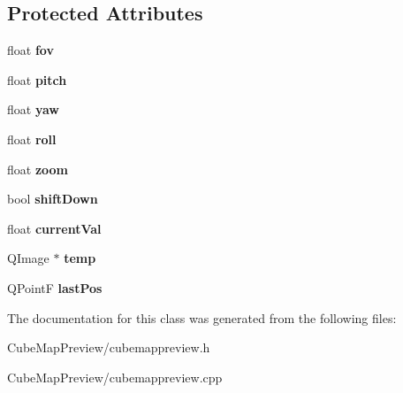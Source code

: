 \subsection*{\-Protected \-Attributes}
\begin{DoxyCompactItemize}
\item 
\hypertarget{class_cube_map_preview_a14b180eef51abeec1198ab9e7edd0cb6}{
float {\bfseries fov}}
\label{class_cube_map_preview_a14b180eef51abeec1198ab9e7edd0cb6}

\item 
\hypertarget{class_cube_map_preview_a75e5535a60a3601b5be758571a10e36c}{
float {\bfseries pitch}}
\label{class_cube_map_preview_a75e5535a60a3601b5be758571a10e36c}

\item 
\hypertarget{class_cube_map_preview_a97255e81b44e4361c1ffd21a59cdbef1}{
float {\bfseries yaw}}
\label{class_cube_map_preview_a97255e81b44e4361c1ffd21a59cdbef1}

\item 
\hypertarget{class_cube_map_preview_a89bc94ef80c7727f288881044f88f332}{
float {\bfseries roll}}
\label{class_cube_map_preview_a89bc94ef80c7727f288881044f88f332}

\item 
\hypertarget{class_cube_map_preview_ac5d08a355bc7d306242b3b1cfffcfeab}{
float {\bfseries zoom}}
\label{class_cube_map_preview_ac5d08a355bc7d306242b3b1cfffcfeab}

\item 
\hypertarget{class_cube_map_preview_a64ea62c489d9867c499e5f06e36404f9}{
bool {\bfseries shift\-Down}}
\label{class_cube_map_preview_a64ea62c489d9867c499e5f06e36404f9}

\item 
\hypertarget{class_cube_map_preview_a05a7c5cfa2a1a502dea0ddb266f1afb9}{
float {\bfseries current\-Val}}
\label{class_cube_map_preview_a05a7c5cfa2a1a502dea0ddb266f1afb9}

\item 
\hypertarget{class_cube_map_preview_a334af58fd41448ce83cb6c48b755242e}{
\-Q\-Image $\ast$ {\bfseries temp}}
\label{class_cube_map_preview_a334af58fd41448ce83cb6c48b755242e}

\item 
\hypertarget{class_cube_map_preview_a42f7be558244055de3092b332d2ae22d}{
\-Q\-Point\-F {\bfseries last\-Pos}}
\label{class_cube_map_preview_a42f7be558244055de3092b332d2ae22d}

\end{DoxyCompactItemize}


\-The documentation for this class was generated from the following files\-:\begin{DoxyCompactItemize}
\item 
\-Cube\-Map\-Preview/cubemappreview.\-h\item 
\-Cube\-Map\-Preview/cubemappreview.\-cpp\end{DoxyCompactItemize}
